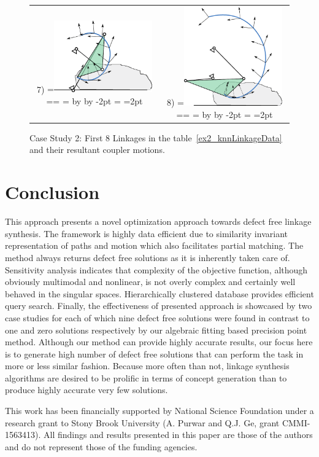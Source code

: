 \documentclass[twocolumn,10pt]{asme2e}
\makeatletter
\newcommand{\putindeepbox}[2][0.7\baselineskip]{{%
    \setbox0=\hbox{#2}%
    \setbox0=\vbox{\noindent\hsize=\wd0\unhbox0}
    \@tempdima=\dp0
    \advance\@tempdima by \ht0
    \advance\@tempdima by -#1\relax
    \dp0=\@tempdima
    \ht0=#1\relax
    \box0
}}
\makeatother
\begin{document}
\begin{figure}
\begin{tabular}{cc}
  7)\putindeepbox[2pt]{\includegraphics[width=120pt]{figure/sol8.eps}}
    & 8)\putindeepbox[2pt]{\includegraphics[width=120pt]{figure/sol9.eps}}\\
\end{tabular}
\caption{Case Study 2: First 8 Linkages in the table~\ref{ex2_knnLinkageData} and their resultant coupler motions.}
\label{ex2_solns}
\end{figure}


\section*{Conclusion}
This approach presents a novel optimization approach towards defect free linkage synthesis.
The framework is highly data efficient due to similarity invariant representation of paths and motion which also facilitates partial matching.
The method always returns defect free solutions as it is inherently taken care of.
Sensitivity analysis indicates that complexity of the objective function, although obviously multimodal and nonlinear, is not overly complex and certainly well behaved in the singular spaces.
Hierarchically clustered database provides efficient query search.
Finally, the effectiveness of presented approach is showcased by two case studies for each of which nine defect free solutions were found in contrast to one and zero solutions respectively by our algebraic fitting based precision point method.
Although our method can provide highly accurate results, our focus here is to generate high number of defect free solutions that can perform the task in more or less similar fashion.
Because more often than not, linkage synthesis algorithms are desired to be prolific in terms of concept generation than to produce highly accurate very few solutions.

\begin{acknowledgment}
This work has been financially supported by National Science Foundation under a research grant to Stony Brook University (A. Purwar and Q.J. Ge, grant CMMI-1563413). All findings and results presented in this paper are those of the authors and do not represent those of the funding agencies.
\end{acknowledgment}



\newpage
\clearpage
\listoftables
\listoffigures
\end{document}
